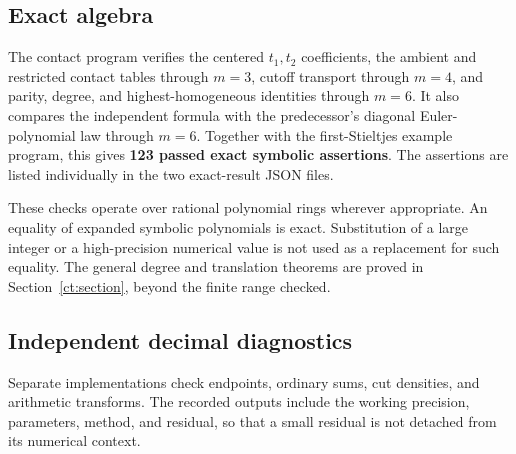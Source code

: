 \documentclass[11pt,letterpaper]{article}
\numberwithin{equation}{section}
\theoremstyle{definition}
\theoremstyle{remark}
\begin{document}
\subsection{Exact algebra}

The contact program verifies the centered \(t_1,t_2\) coefficients, the
ambient and restricted contact tables through \(m=3\), cutoff transport
through \(m=4\), and parity, degree, and highest-homogeneous identities
through \(m=6\). It also compares the independent formula with the
predecessor's diagonal Euler-polynomial law through \(m=6\).
Together with the first-Stieltjes example program, this gives
\textbf{123 passed exact symbolic assertions}. The assertions are listed
individually in the two exact-result JSON files.

These checks operate over rational polynomial rings wherever appropriate.
An equality of expanded symbolic polynomials is exact. Substitution of a
large integer or a high-precision numerical value is not used as a
replacement for such equality. The general degree and translation theorems
are proved in Section~\ref{ct:section}, beyond the finite range checked.

\subsection{Independent decimal diagnostics}

Separate implementations check endpoints, ordinary sums, cut densities,
and arithmetic transforms. The recorded outputs include the working
precision, parameters, method, and residual, so that a small residual
is not detached from its numerical context.
\end{document}
